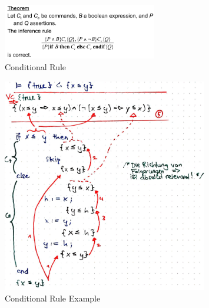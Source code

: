 \begin{figure}[H]
\centering
\includegraphics[width=0.6\textwidth]{figures/conditionalRule.png}
\caption{Conditional Rule}
\end{figure}

\begin{figure}[H]
\centering
\includegraphics[width=0.8\textwidth]{figures/exampleConditional.png}
\caption{Conditional Rule Example}
\end{figure}

\clearpage